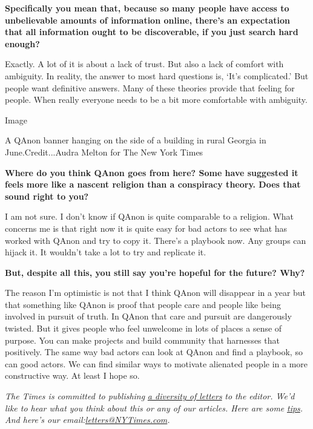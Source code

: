 \textbf{Specifically you mean that, because so many people have access
to unbelievable amounts of information online, there's an expectation
that all information ought to be discoverable, if you just search hard
enough?}

Exactly. A lot of it is about a lack of trust. But also a lack of
comfort with ambiguity. In reality, the answer to most hard questions
is, `It's complicated.' But people want definitive answers. Many of
these theories provide that feeling for people. When really everyone
needs to be a bit more comfortable with ambiguity.

Image

A QAnon banner hanging on the side of a building in rural Georgia in
June.Credit...Audra Melton for The New York Times

\textbf{Where do you think QAnon goes from here? Some have suggested it
feels more like a nascent religion than a conspiracy theory. Does that
sound right to you?}

I am not sure. I don't know if QAnon is quite comparable to a religion.
What concerns me is that right now it is quite easy for bad actors to
see what has worked with QAnon and try to copy it. There's a playbook
now. Any groups can hijack it. It wouldn't take a lot to try and
replicate it.

\textbf{But, despite all this, you still say you're hopeful for the
future? Why?}

The reason I'm optimistic is not that I think QAnon will disappear in a
year but that something like QAnon is proof that people care and people
like being involved in pursuit of truth. In QAnon that care and pursuit
are dangerously twisted. But it gives people who feel unwelcome in lots
of places a sense of purpose. You can make projects and build community
that harnesses that positively. The same way bad actors can look at
QAnon and find a playbook, so can good actors. We can find similar ways
to motivate alienated people in a more constructive way. At least I hope
so.

\emph{The Times is committed to publishing}
\href{https://www.nytimes3xbfgragh.onion/2019/01/31/opinion/letters/letters-to-editor-new-york-times-women.html}{\emph{a
diversity of letters}} \emph{to the editor. We'd like to hear what you
think about this or any of our articles. Here are some}
\href{https://help.nytimes3xbfgragh.onion/hc/en-us/articles/115014925288-How-to-submit-a-letter-to-the-editor}{\emph{tips}}\emph{.
And here's our
email:}\href{mailto:letters@NYTimes.com}{\emph{letters@NYTimes.com}}\emph{.}

